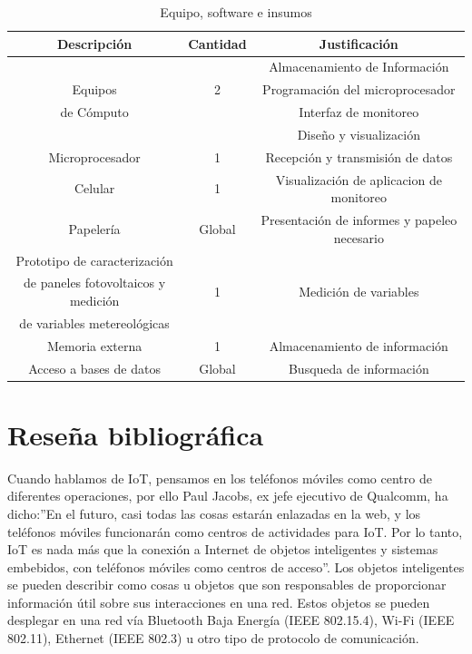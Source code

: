 \begin{table}[ht]
\caption{\label{tab:Resumen-costos-equipo} Equipo, software e insumos}
\begin{centering}
\begin{tabular}{|c||c||c|}
\hline 
\textbf{Descripción} & \textbf{Cantidad} & \textbf{Justificación} \tabularnewline
\hline
\hline 
 &  &  Almacenamiento de Información\tabularnewline
Equipos  & 2 & Programación del microprocesador \tabularnewline
 de Cómputo &  & Interfaz de monitoreo \tabularnewline & & Diseño y visualización   \tabularnewline
 \hline
 \hline
Microprocesador  & 1 & Recepción y transmisión de datos   \tabularnewline
\hline  
\hline
Celular  & 1 &  Visualización de aplicacion de monitoreo\tabularnewline
\hline 
\hline
Papelería & Global & Presentación de informes y papeleo necesario  \tabularnewline 
\hline 
\hline
Prototipo de caracterización &  &  \tabularnewline 
de paneles fotovoltaicos y medición & 1 & Medición de variables \tabularnewline 
de variables metereológicas & & \tabularnewline 
\hline
\hline
Memoria externa  & 1 & Almacenamiento de información\tabularnewline
\hline
\hline
Acceso a bases de datos & Global & Busqueda de información \tabularnewline
\hline
\hline
\end{tabular}
\par\end{centering}
\end{table}


\newpage
\chapter{Reseña bibliográfica}

Cuando hablamos de IoT, pensamos en los teléfonos móviles como centro de diferentes operaciones, por ello Paul Jacobs, ex jefe ejecutivo de Qualcomm, ha dicho:''En el futuro, casi todas las cosas estarán enlazadas en la web, y los teléfonos móviles funcionarán como centros de actividades para IoT. Por lo tanto, IoT es nada más que la conexión a Internet de objetos inteligentes y sistemas embebidos, con teléfonos móviles como centros de acceso''. Los objetos inteligentes se pueden describir como cosas u objetos que son responsables de proporcionar información útil sobre sus interacciones en una red. Estos objetos se pueden desplegar en una red vía Bluetooth Baja Energía (IEEE 802.15.4), Wi-Fi (IEEE 802.11), Ethernet (IEEE 802.3) u otro tipo de protocolo de comunicación.

